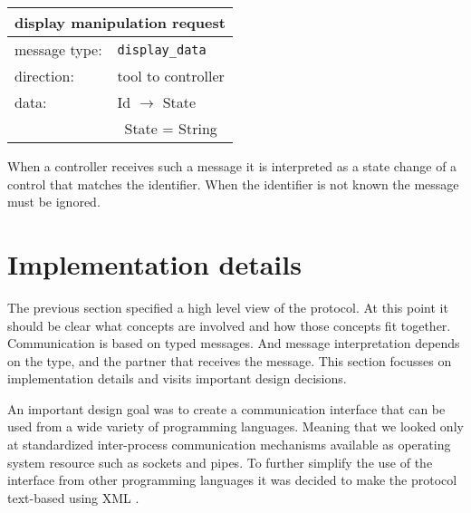 \documentclass{article}
\newcommand{\msg}[1]{\texttt{#1}}
\begin{document}
   \begin{table}[H]
    \begin{center}
     \begin{tabular}{|ll|}
      \hline
       \multicolumn{2}{|l|}{\textbf{display manipulation request}} \\
      \hline
       message type:   & \msg{display\_data} \\
      \hline
       direction:      & tool to controller \\
       data:           & Id $\rightarrow$ State \\
                       & \ State = String \\
      \hline
     \end{tabular}
    \end{center}
   \vspace{-0.4cm}
   \end{table}

   \noindent When a controller receives such a message it is interpreted as a
   state change of a control that matches the identifier. When the identifier
   is not known the message must be ignored.


\pagebreak
 \section{Implementation details} \label{s:protocol_implementation}

   The previous section specified a high level view of the protocol. At this
   point it should be clear what concepts are involved and how those concepts
   fit together. Communication is based on typed messages. And message
   interpretation depends on the type, and the partner that receives the
   message. This section focusses on implementation details and visits
   important design decisions.
   
   An important design goal was to create a communication interface that can be
   used from a wide variety of programming languages. Meaning that we looked
   only at standardized inter-process communication mechanisms available as
   operating system resource such as sockets and pipes. To further simplify
   the use of the interface from other programming languages it was decided
   to make the protocol text-based using XML \cite{XML-1_0-4}.
\end{document}
